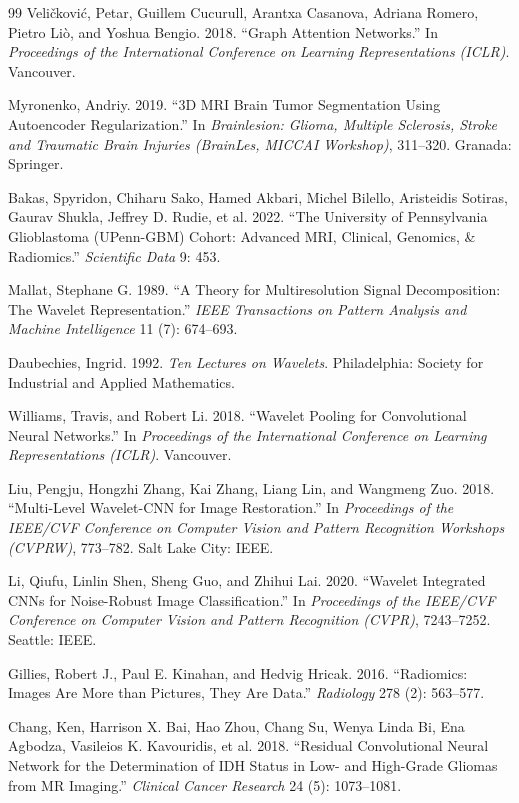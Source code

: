\documentclass[conference]{IEEEtran}
\begin{document}
\begin{thebibliography}{99}
Veli\v{c}kovi\'{c}, Petar, Guillem Cucurull, Arantxa Casanova, Adriana Romero, Pietro Li\`{o}, and Yoshua Bengio. 2018. ``Graph Attention Networks.'' In \textit{Proceedings of the International Conference on Learning Representations (ICLR)}. Vancouver.

Myronenko, Andriy. 2019. ``3D MRI Brain Tumor Segmentation Using Autoencoder Regularization.'' In \textit{Brainlesion: Glioma, Multiple Sclerosis, Stroke and Traumatic Brain Injuries (BrainLes, MICCAI Workshop)}, 311--320. Granada: Springer.

Bakas, Spyridon, Chiharu Sako, Hamed Akbari, Michel Bilello, Aristeidis Sotiras, Gaurav Shukla, Jeffrey D. Rudie, et al. 2022. ``The University of Pennsylvania Glioblastoma (UPenn-GBM) Cohort: Advanced MRI, Clinical, Genomics, \& Radiomics.'' \textit{Scientific Data} 9: 453.

Mallat, Stephane G. 1989. ``A Theory for Multiresolution Signal Decomposition: The Wavelet Representation.'' \textit{IEEE Transactions on Pattern Analysis and Machine Intelligence} 11 (7): 674--693.

Daubechies, Ingrid. 1992. \textit{Ten Lectures on Wavelets}. Philadelphia: Society for Industrial and Applied Mathematics.

Williams, Travis, and Robert Li. 2018. ``Wavelet Pooling for Convolutional Neural Networks.'' In \textit{Proceedings of the International Conference on Learning Representations (ICLR)}. Vancouver.

Liu, Pengju, Hongzhi Zhang, Kai Zhang, Liang Lin, and Wangmeng Zuo. 2018. ``Multi-Level Wavelet-CNN for Image Restoration.'' In \textit{Proceedings of the IEEE/CVF Conference on Computer Vision and Pattern Recognition Workshops (CVPRW)}, 773--782. Salt Lake City: IEEE.

Li, Qiufu, Linlin Shen, Sheng Guo, and Zhihui Lai. 2020. ``Wavelet Integrated CNNs for Noise-Robust Image Classification.'' In \textit{Proceedings of the IEEE/CVF Conference on Computer Vision and Pattern Recognition (CVPR)}, 7243--7252. Seattle: IEEE.

Gillies, Robert J., Paul E. Kinahan, and Hedvig Hricak. 2016. ``Radiomics: Images Are More than Pictures, They Are Data.'' \textit{Radiology} 278 (2): 563--577.

Chang, Ken, Harrison X. Bai, Hao Zhou, Chang Su, Wenya Linda Bi, Ena Agbodza, Vasileios K. Kavouridis, et al. 2018. ``Residual Convolutional Neural Network for the Determination of IDH Status in Low- and High-Grade Gliomas from MR Imaging.'' \textit{Clinical Cancer Research} 24 (5): 1073--1081.


\end{thebibliography}
\end{document}
